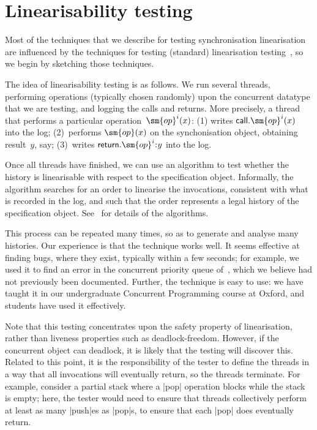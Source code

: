 
\section{Linearisability testing}

Most of the techniques that we describe for testing synchronisation
linearisation are influenced by the techniques for testing (standard)
linearisation testing~\cite{gavin:lin-testing}, so we begin by sketching those
techniques. 

The idea of linearisability testing is as follows.  We run several threads,
performing operations (typically chosen randomly) upon the concurrent datatype
that we are testing, and logging the calls and returns.  More precisely, a
thread that performs a particular operation~$\sm{op}^i(x)$: (1) writes
$\call.\sm{op}^i(x)$ into the log; (2)~performs $\sm{op}(x)$ on the
synchonisation object, obtaining result~$y$, say; (3)~writes $\return.\sm{op}^i
\:: y$ into the log.  

Once all threads have finished, we can use an algorithm to test whether the
history is linearisable with respect to the specification object.  Informally,
the algorithm searches for an order to linearise the invocations, consistent
with what is recorded in the log, and such that the order represents a legal
history of the specification object.  See~\cite{gavin:lin-testing} for details
of the algorithms.

This process can be repeated many times, so as to generate and analyse many
histories.  Our experience is that the technique works well.  It seems
effective at finding bugs, where they exist, typically within a few seconds;
for example, we used it to find an error in the concurrent priority queue
of~\cite{faulty-pri-queue}, which we believe had not previously been
documented.  Further, the technique is easy to use: we have taught it in our
undergraduate Concurrent Programming course at Oxford, and students have used
it effectively.

Note that this testing concentrates upon the safety property of linearisation,
rather than liveness properties such as deadlock-freedom.  However, if the
concurrent object can deadlock, it is likely that the testing will discover
this.  Related to this point, it is the responsibility of the tester to define
the threads in a way that all invocations will eventually return, so the
threads terminate.  For example, consider a partial stack where a |pop|
operation blocks while the stack is empty; here, the tester would need to
ensure that threads collectively perform at least as many |push|es as |pop|s,
to ensure that each |pop| does eventually return.

